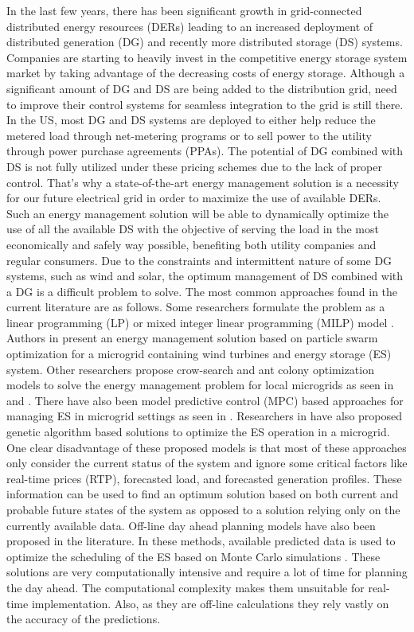 In the last few years, there has been significant growth in grid-connected distributed energy resources (DERs) leading to an increased deployment of distributed generation (DG) and recently more distributed storage (DS) systems. Companies are starting to heavily invest in the competitive energy storage system market by taking advantage of the decreasing costs of energy storage. Although a significant amount of DG and DS are being added to the distribution grid, need to improve their control systems for seamless integration to the grid is still there. In the US, most DG and DS systems are deployed to either help reduce the metered load through net-metering programs or to sell power to the utility through power purchase agreements (PPAs). The potential of DG combined with DS is not fully utilized under these pricing schemes due to the lack of proper control. That's why a state-of-the-art energy management solution is a necessity for our future electrical grid in order to maximize the use of available DERs. Such an energy management solution will be able to dynamically optimize the use of all the available DS with the objective of serving the load in the most economically and safely way possible, benefiting both utility companies and regular consumers. Due to the constraints and intermittent nature of some DG systems, such as wind and solar, the optimum management of DS combined with a DG is a difficult problem to solve. The most common approaches found in the current literature are as follows. Some researchers formulate the problem as a linear programming (LP) or mixed integer linear programming (MILP) model \cite{lp73, lp74, lp75}. Authors in \cite{pso80, pso81} present an energy management solution based on particle swarm optimization for a microgrid containing wind turbines and energy storage (ES) system. Other researchers propose crow-search and ant colony optimization models to solve the energy management problem for local microgrids as seen in \cite{csa87} and \cite{aco84}. There have also been model predictive control (MPC) based approaches for managing ES in microgrid settings as seen in \cite{energymanajaboulay,mpcmorstyn}.  Researchers in \cite{ga76, ga77} have also proposed genetic algorithm based solutions to optimize the ES operation in a microgrid. One clear disadvantage of these proposed models is that most of these approaches only consider the current status of the system and ignore some critical factors like real-time prices (RTP), forecasted load, and forecasted generation profiles.  These information can be used to find an optimum solution based on both current and probable future states of the system as opposed to a solution relying only on the currently available data. Off-line day ahead planning models have also been proposed in the literature. In these methods, available predicted data is used to optimize the scheduling of the ES based on Monte Carlo simulations \cite{6872821,7010943,6839110}. These solutions are very computationally intensive and require a lot of time for planning the day ahead. The computational complexity makes them unsuitable for real-time implementation. Also, as they are off-line calculations they rely vastly on the accuracy of the predictions.

